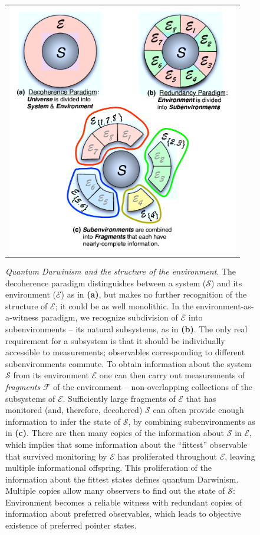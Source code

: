 \documentclass[aps,rmp,floatfix,11pt]{revtex4}
\newcommand{\Sys}{\ensuremath{\mathcal{S}}}
\newcommand{\Env}{\ensuremath{\mathcal{E}}}
\def\FCW{4in}
\newcommand{\cS}        {{\mathcal S}}
\newcommand{\cE}        {{\mathcal E}}
\newcommand{\+}         {\dagger}
\newcommand\cF{{\mathcal F}}
\begin{document}
\begin{figure}[p]
\begin{tabular}{l}
\vspace{-0.15in} \includegraphics[width=4.0in]{EnvSubdivision.pdf}\\
\end{tabular}
\caption{\footnotesize \emph{Quantum Darwinism and the structure of the environment}.  The decoherence paradigm distinguishes between a system ($\Sys$) and its environment ($\Env$) as in \textbf{(a)}, but makes no further recognition of the structure of $\cE$; it could be as well monolithic.  In the environment-as-a-witness paradigm, we recognize subdivision of $\Env$ into subenvironments -- its natural subsystems, as in \textbf{(b)}. The only real requirement for a subsystem is that it should be individually accessible to measurements; observables corresponding to different subenvironments commute. To obtain information about the system $\cS$ from its environment $\cE$ one can then carry out measurements 
of \emph{fragments} $\cF$ of the environment -- non-overlapping collections of the subsystems of $\cE$.  Sufficiently large fragments of $\cE$ that has monitored (and, therefore, decohered) $\cS$ can often 
provide enough information to infer the state of $\Sys$, by combining subenvironments as in \textbf{(c)}.  
There are then many copies of the information about $\cS$ in $\cE$, which implies that some information 
about the ``fittest'' observable that survived monitoring by $\cE$ has proliferated throughout $\cE$, leaving multiple informational offspring. This proliferation of the information about the fittest states defines
quantum Darwinism. Multiple copies allow many observers to find out the state of $\cS$: Environment becomes a reliable witness with redundant copies of information about preferred
observables, which leads to objective existence of preferred pointer states.}
\label{EnvSubdivision}
\end{figure}
\end{document}
